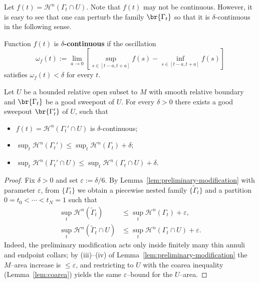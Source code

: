 Let $f(t) = \mathcal{H}^n(\Gamma_t\cap U)$. Note that $f(t)$ may not be continuous. However, it is easy
to see that one can perturb the family $\br{\Gamma_t}$ so that it is $\delta$-continuous in the
following sense.
\begin{definition}
    Function $f(t)$ is \textbf{$\delta$-continuous} if the oscillation
    \begin{equation*}
        \omega_f(t) := \lim_{a \to 0}[\sup_{s \in [t - a, t + a]}f(s) - \inf_{s \in [t - a, t + a]}f(s)]
    \end{equation*}
    satisfies $\omega_f(t) < \delta$ for every $t$.
\end{definition}
\begin{lemma}\label{lem:delta-cts-perturbation}
    Let $U$ be a bounded relative open subset to $M$ with smooth relative boundary and $\br{\Gamma_t}$ be a good sweepout of $U$. For every $\delta > 0$ there exists a good sweepout $\br{\Gamma'_t}$ of $U$, such that 
    \begin{itemize}
        \item $f(t) = \mathcal{H}^n(\Gamma_t'\cap U)$ is $\delta$-continuous;
        \item $\sup_{t}\mathcal{H}^n(\Gamma_t') \leq \sup_{t}\mathcal{H}^n(\Gamma_t) + \delta$;
        \item $\sup_{t}\mathcal{H}^n(\Gamma_t'\cap U) \leq \sup_{t}\mathcal{H}^n(\Gamma_t\cap U) + \delta$.
    \end{itemize}
    \begin{proof}
        Fix $\delta>0$ and set $\varepsilon:=\delta/6$.
        By Lemma~\ref{lem:preliminary-modification} with parameter $\varepsilon$, from $\{\Gamma_t\}$ we obtain a piecewise nested family $\{\widetilde{\Gamma}_t\}$ and a partition $0=t_0<\cdots<t_N=1$ such that
        \begin{equation*}
        \begin{split}
        \sup_{t}\mathcal{H}^n(\widetilde{\Gamma}_t)
        &\le \sup_{t}\mathcal{H}^n(\Gamma_t)+\varepsilon,\\
        \sup_{t}\mathcal{H}^n(\widetilde{\Gamma}_t\cap U)
        &\le \sup_{t}\mathcal{H}^n(\Gamma_t\cap U)+\varepsilon.
        \end{split}
        \end{equation*}
        Indeed, the preliminary modification acts only inside finitely many thin annuli and endpoint collars; by (iii)–(iv) of Lemma~\ref{lem:preliminary-modification} the $M$–area increase is $\le\varepsilon$, and restricting to $U$ with the coarea inequality (Lemma~\ref{lem:coarea}) yields the same $\varepsilon$–bound for the $U$–area.
    

\end{proof}
\end{lemma}
